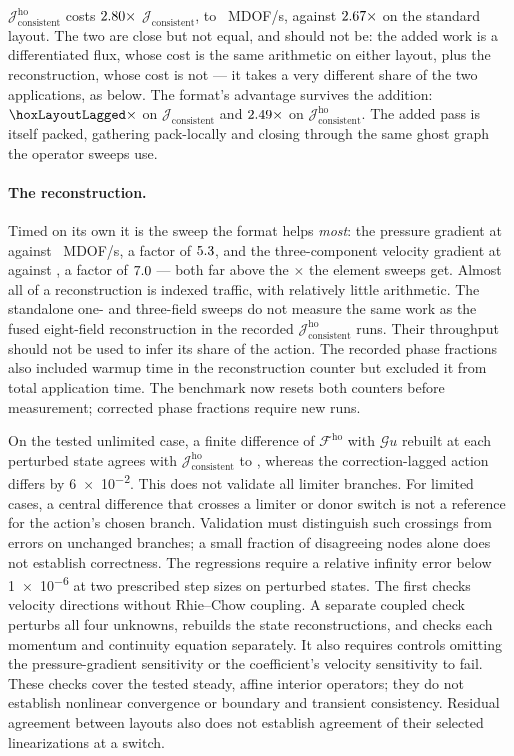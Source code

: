 \documentclass[sigconf,nonacm]{acmart}
\newcommand{\Gop}{\mathcal{G}}
\newcommand{\Fho}{\mathcal{F}^{\mathrm{ho}}}
\newcommand{\Jex}{\mathcal{J}_{\mathrm{consistent}}}
\newcommand{\Jhoex}{\mathcal{J}^{\mathrm{ho}}_{\mathrm{consistent}}}
\begin{document}
$\Jhoex$ costs $2.80\times$ $\Jex$, \hoxLaggedPacked{} to
\hoxExactPacked{}~MDOF/s, against $2.67\times$ on the standard layout. The two are close
but not equal, and should not be: the added work is a differentiated flux, whose cost is the same
arithmetic on either layout, plus the reconstruction, whose cost is not --- it takes a very
different share of the two applications, as below. The format's advantage survives the addition:
$\hoxLayoutLagged\times$ on $\Jex$ and $2.49\times$ on $\Jhoex$. The added pass is
itself packed, gathering pack-locally and closing through the same ghost graph the operator
sweeps use.

\paragraph{The reconstruction.} Timed on its own it is the sweep the format helps \emph{most}:
the pressure gradient at \ngPgradPacked{} against \ngPgradAtomic{}~MDOF/s, a factor of
$5.3$, and the three-component velocity gradient at \ngUgradPacked{} against
\ngUgradAtomic{}, a factor of $7.0$ --- both far above the
\hoxLayoutLagged$\times$ the element sweeps get. Almost all of a reconstruction is indexed
traffic, with relatively little arithmetic. The standalone one- and three-field sweeps
do not measure the same work as the fused eight-field reconstruction in the recorded
$\Jhoex$ runs. Their throughput should not be used to infer its share of the action.
The recorded phase fractions also included warmup time in the reconstruction counter
but excluded it from total application time. The benchmark now resets both counters
before measurement; corrected phase fractions require new runs.

On the tested unlimited case, a finite difference of $\Fho$ with $\Gop u$ rebuilt at
each perturbed state agrees with $\Jhoex$ to \hoxFdUnlim{}, whereas the
correction-lagged action differs by \num{6e-2}. This does not validate all limiter
branches. For limited cases, a central difference that crosses a limiter or donor
switch is not a reference for the action's chosen branch. Validation must distinguish
such crossings from errors on unchanged branches; a small fraction of disagreeing
nodes alone does not establish correctness. The regressions require a relative infinity
error below \num{1e-6} at two prescribed step sizes on perturbed states. The first
checks velocity directions without Rhie--Chow coupling. A separate coupled check
perturbs all four unknowns, rebuilds the state reconstructions, and checks each
momentum and continuity equation separately. It also requires controls omitting the
pressure-gradient sensitivity or the coefficient's velocity sensitivity to fail.
These checks cover the tested steady, affine interior operators; they do not establish
nonlinear convergence or boundary and transient consistency. Residual agreement
between layouts also does not establish agreement of their selected linearizations
at a switch.
\end{document}
